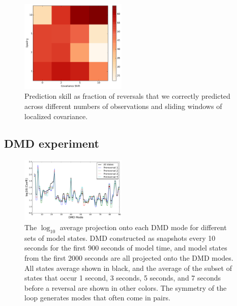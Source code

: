 \begin{figure}[t]
  \centering
  \includegraphics[width=0.45\textwidth]{../figures/2015-09-13-23-04-consuela.pdf}
  \caption[]{
    Prediction skill as fraction of reversals that we correctly predicted across different numbers of observations and sliding windows of localized covariance.
  }
  \label{fig:sliding_results}
\end{figure}

\subsection{DMD experiment}

\begin{figure}[t]
  \centering
  \includegraphics[width=0.45\textwidth]{../figures/DMD/DMD_modes_pre_reversals.pdf}
  \caption[]{
    The $\log_{10}$ average projection onto each DMD mode for different sets of model states.
    DMD constructed as snapshots every 10 seconds for the first 900 seconds of model time, and model states from the first 2000 seconds are all projected onto the DMD modes.
    All states average shown in black, and the average of the subset of states that occur 1 second, 3 seconds, 5 seconds, and 7 seconds before a reversal are shown in other colors.
    The symmetry of the loop generates modes that often come in pairs.
      }
  \label{fig:DMD_modes}
\end{figure}

